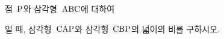 점~$\mathrm{P}$와 삼각형~$\mathrm{ABC}$에 대하여\par\smallskip{}\par\smallskip\noindent 일 때, 삼각형~$\mathrm{CAP}$와 삼각형~$\mathrm{CBP}$의 넓이의 비를 구하시오.
